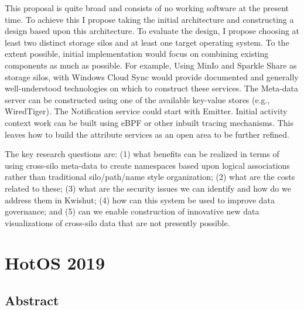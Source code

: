 This proposal is quite broad and consists of no working software at the present
time.  To achieve this I propose taking the initial architecture and
constructing a design based upon this architecture.  To evaluate the design, I
propose choosing at least two distinct storage silos and at least one target
operating system.  To the extent possible, initial implementation would focus on
combining existing components as much as possible.  For example, Using MinIo and
Sparkle Share as storage silos, with Windows Cloud Sync would provide documented
and generally well-understood technologies on which to construct these services.
The Meta-data server can be constructed using one of the available key-value
stores (e.g., WiredTiger).  The Notification service could start with Emitter.
Initial activity context work can be built using eBPF or other inbuilt tracing
mechanisms.  This leaves how to build the attribute services as an open area to
be further refined. 


The key research questions are: (1) what benefits can be realized in terms of
using cross-silo meta-data to create namespaces based upon logical associations
rather than traditional silo/path/name style organization; (2) what are the
costs related to these; (3) what are the security issues we can identify and how
do we address them in Kwishut; (4) how can this system be used to improve data
governance; and (5) can we enable construction of innovative new data
visualizations of cross-silo data that are not presently possible.

\section{HotOS 2019}
\label{ch:appendix:section:hotos19}


\subsection{Abstract}

